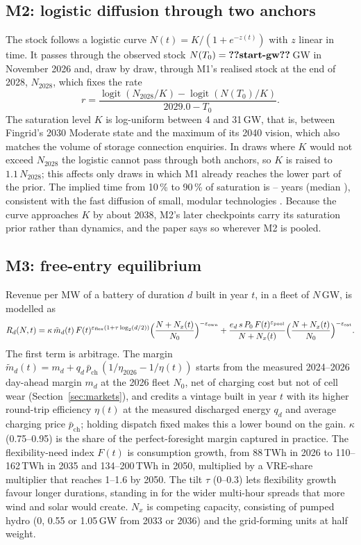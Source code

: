 \documentclass[11pt]{article}
\begin{document}
\subsection{M2: logistic diffusion through two anchors}
The stock follows a logistic curve $N(t)=K/(1+e^{-z(t)})$ with $z$ linear in time. It passes through the observed stock $N(T_0)=\val{start-gw}$\,GW in November 2026 and, draw by draw, through M1's realised stock at the end of 2028, $N_{2028}$, which fixes the rate
\begin{equation}
r = \frac{\operatorname{logit}(N_{2028}/K)-\operatorname{logit}(N(T_0)/K)}{2029.0-T_0}.
\end{equation}
The saturation level $K$ is log-uniform between 4 and 31\,GW, that is, between Fingrid's 2030 Moderate state and the maximum of its 2040 vision, which also matches the volume of storage connection enquiries. In draws where $K$ would not exceed $N_{2028}$ the logistic cannot pass through both anchors, so $K$ is raised to $1.1\,N_{2028}$; this affects only draws in which M1 already reaches the lower part of the prior.
The implied time from 10\,\% to 90\,\% of saturation is -- years (median ), consistent with the fast diffusion of small, modular technologies \citep{wilson2020granular}.
Because the curve approaches $K$ by about 2038, M2's later checkpoints carry its saturation prior rather than dynamics, and the paper says so wherever M2 is pooled.

\subsection{M3: free-entry equilibrium}\label{sec:m3}
Revenue per MW of a battery of duration $d$ built in year $t$, in a fleet of $N$\,GW, is modelled as
\begin{equation}\label{eq:rev}
R_d(N,t) = \kappa\, \tilde m_d(t)\, F(t)^{\varepsilon_{\mathrm{flex}}\left(1+\tau\log_2(d/2)\right)}
\Bigl(\frac{N+N_x(t)}{N_0}\Bigr)^{-\varepsilon_{\mathrm{own}}}
+ \frac{e_d\, s\, P_0\, F(t)^{\varepsilon_{\mathrm{pool}}}}{N+N_x(t)}\Bigl(\frac{N+N_x(t)}{N_0}\Bigr)^{-\varepsilon_{\mathrm{sat}}}.
\end{equation}
The first term is arbitrage. The margin $\tilde m_d(t) = m_d + q_d\,\bar p_{\mathrm{ch}}\,(1/\eta_{2026} - 1/\eta(t))$ starts from the measured 2024--2026 day-ahead margin $m_d$ at the 2026 fleet $N_0$, net of charging cost but not of cell wear (Section~\ref{sec:markets}), and credits a vintage built in year $t$ with its higher round-trip efficiency $\eta(t)$ at the measured discharged energy $q_d$ and average charging price $\bar p_{\mathrm{ch}}$; holding dispatch fixed makes this a lower bound on the gain. $\kappa$ (0.75--0.95) is the share of the perfect-foresight margin captured in practice.
The flexibility-need index $F(t)$ is consumption growth, from 88\,TWh in 2026 to 110--162\,TWh in 2035 and 134--200\,TWh in 2050, multiplied by a VRE-share multiplier that reaches 1--1.6 by 2050.
The tilt $\tau$ (0--0.3) lets flexibility growth favour longer durations, standing in for the wider multi-hour spreads that more wind and solar would create.
$N_x$ is competing capacity, consisting of pumped hydro (0, 0.55 or 1.05\,GW from 2033 or 2036) and the grid-forming units at half weight.
\end{document}
